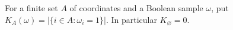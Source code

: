 \begin{definition}
For a finite set $A$ of coordinates and a Boolean sample $\omega$, put
$K_A(\omega)=|\{i\in A:\omega_i=1\}|$.
In particular $K_\varnothing=0$.
\end{definition}
